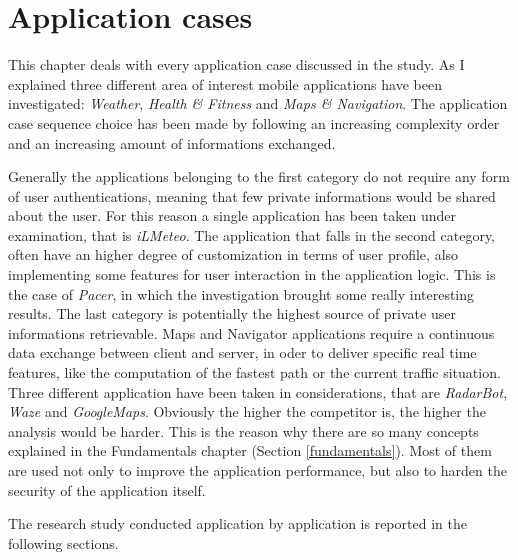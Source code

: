 \chapter{Application cases}
\label{chap:use_cases}
	\par This chapter deals with every application case discussed in the study. As I explained three different area of interest mobile applications have been investigated: \textit{Weather}, \textit{Health \& Fitness} and \textit{Maps \& Navigation}. The application case sequence choice  has been made by following an increasing complexity order and an increasing amount of informations exchanged. \newline
	\par Generally the applications belonging to the first category do not require any form of user authentications, meaning that few private informations would be shared about the user. For this reason a single application has been taken under examination, that is \textit{iLMeteo}.\newline
	The application that falls in the second category, often have an higher degree of customization in terms of user profile, also implementing some features for user interaction in the application logic. This is the case of \textit{Pacer}, in which the investigation brought some really interesting results.\newline
	The last category is potentially the highest source of private user informations retrievable. Maps and Navigator applications require a continuous data exchange between client and server, in oder to deliver specific real time features, like the computation of the fastest path or the current traffic situation. Three different application have been taken in considerations, that are \textit{RadarBot}, \textit{Waze} and \textit{GoogleMaps}. \newline
	Obviously the higher the competitor is, the higher the analysis would be harder. This is the reason why there are so many concepts explained in the Fundamentals chapter (Section \ref{fundamentals}). Most of them are used not only to improve the application performance, but also to harden the security of the application itself. \newline
	\par The research study conducted application by application is reported in the following sections.
	
	
	
	
	
	
	
	
	
	
	
	